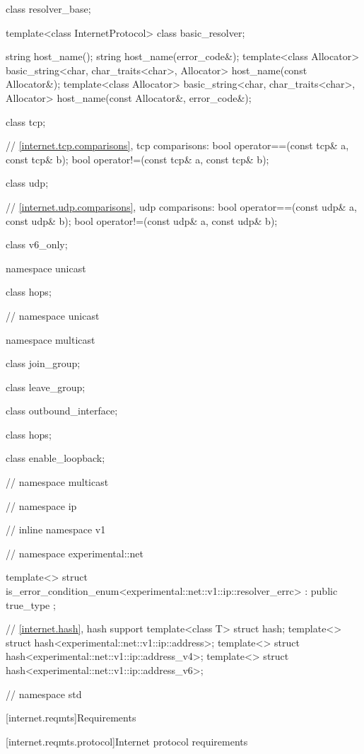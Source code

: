\begin{codeblock}
{{{{  class resolver_base;

  template<class InternetProtocol>
    class basic_resolver;

  string host_name();
  string host_name(error_code&);
  template<class Allocator>
    basic_string<char, char_traits<char>, Allocator>
      host_name(const Allocator&);
  template<class Allocator>
    basic_string<char, char_traits<char>, Allocator>
      host_name(const Allocator&, error_code&);

  class tcp;

  // \ref{internet.tcp.comparisons}, tcp comparisons:
  bool operator==(const tcp& a, const tcp& b);
  bool operator!=(const tcp& a, const tcp& b);

  class udp;

  // \ref{internet.udp.comparisons}, udp comparisons:
  bool operator==(const udp& a, const udp& b);
  bool operator!=(const udp& a, const udp& b);

  class v6_only;

  namespace unicast {

    class hops;

  } // namespace unicast

  namespace multicast {

    class join_group;

    class leave_group;

    class outbound_interface;

    class hops;

    class enable_loopback;

  } // namespace multicast
} // namespace ip
} // inline namespace v1
} // namespace experimental::net

  template<> struct is_error_condition_enum<experimental::net::v1::ip::resolver_errc>
    : public true_type {};

  // \ref{internet.hash}, hash support
  template<class T> struct hash;
  template<> struct hash<experimental::net::v1::ip::address>;
  template<> struct hash<experimental::net::v1::ip::address_v4>;
  template<> struct hash<experimental::net::v1::ip::address_v6>;

} // namespace std
\end{codeblock}



[internet.reqmts]{Requirements}


%
%
[internet.reqmts.protocol]{Internet protocol requirements}

